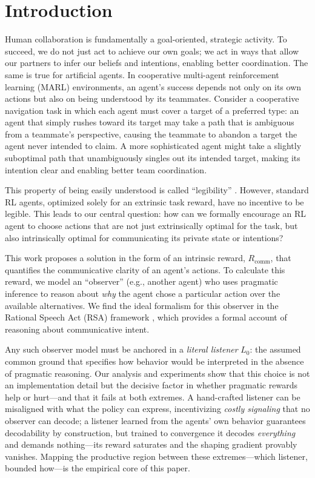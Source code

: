 \documentclass{article}
\newcommand{\Rcomm}{R_{\text{comm}}}
\begin{document}
\section{Introduction}
\label{sec:intro}

Human collaboration is fundamentally a goal-oriented, strategic activity. To succeed, we do not just act to achieve our own goals; we act in ways that allow our partners to infer our beliefs and intentions, enabling better coordination. The same is true for artificial agents. In cooperative multi-agent reinforcement learning (MARL) environments, an agent's success depends not only on its own actions but also on being understood by its teammates. Consider a cooperative navigation task in which each agent must cover a target of a preferred type: an agent that simply rushes toward its target may take a path that is ambiguous from a teammate's perspective, causing the teammate to abandon a target the agent never intended to claim. A more sophisticated agent might take a slightly suboptimal path that unambiguously singles out its intended target, making its intention clear and enabling better team coordination.

This property of being easily understood is called ``legibility'' \cite{dragan2013legibility}. However, standard RL agents, optimized solely for an extrinsic task reward, have no incentive to be legible. This leads to our central question: how can we formally encourage an RL agent to choose actions that are not just extrinsically optimal for the task, but also intrinsically optimal for communicating its private state or intentions?

This work proposes a solution in the form of an intrinsic reward, $\Rcomm$, that quantifies the communicative clarity of an agent's actions. To calculate this reward, we model an ``observer'' (e.g., another agent) who uses pragmatic inference to reason about \emph{why} the agent chose a particular action over the available alternatives. We find the ideal formalism for this observer in the Rational Speech Act (RSA) framework \cite{goodman2016pragmatic}, which provides a formal account of reasoning about communicative intent.

Any such observer model must be anchored in a \emph{literal listener} $L_0$: the assumed common ground that specifies how behavior would be interpreted in the absence of pragmatic reasoning. Our analysis and experiments show that this choice is not an implementation detail but the decisive factor in whether pragmatic rewards help or hurt---and that it fails at both extremes. A hand-crafted listener can be misaligned with what the policy can express, incentivizing \emph{costly signaling} that no observer can decode; a listener learned from the agents' own behavior guarantees decodability by construction, but trained to convergence it decodes \emph{everything} and demands nothing---its reward saturates and the shaping gradient provably vanishes. Mapping the productive region between these extremes---which listener, bounded how---is the empirical core of this paper.
\end{document}
